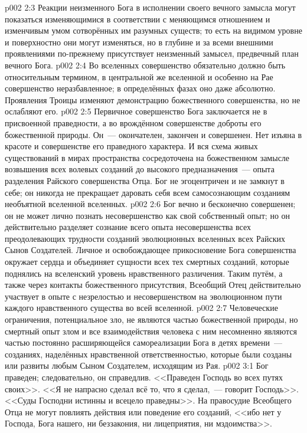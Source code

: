 \vs p002 2:3 \pc Реакции неизменного Бога в исполнении своего вечного замысла могут показаться изменяющимися в соответствии с меняющимся отношением и изменчивым умом сотворённых им разумных существ; то есть на видимом уровне и поверхностно они могут изменяться, но в глубине и за всеми внешними проявлениями по\hyp{}прежнему присутствует неизменный замысел, предвечный план вечного Бога.
\vs p002 2:4 Во вселенных совершенство обязательно должно быть относительным термином, в центральной же вселенной и особенно на Рае совершенство неразбавленное; в определённых фазах оно даже абсолютно. Проявления Троицы изменяют демонстрацию божественного совершенства, но не ослабляют его.
\vs p002 2:5 \pc Первичное совершенство Бога заключается не в присвоенной праведности, а во врождённом совершенстве доброты его божественной природы. Он~--- окончателен, закончен и совершенен. Нет изъяна в красоте и совершенстве его праведного характера. И вся схема живых существований в мирах пространства сосредоточена на божественном замысле возвышения всех волевых созданий до высокого предназначения~--- опыта разделения Райского совершенства Отца. Бог не эгоцентричен и не замкнут в себе; он никогда не прекращает даровать себя всем самосознающим созданиям необъятной вселенной вселенных.
\vs p002 2:6 Бог вечно и бесконечно совершенен; он не может лично познать несовершенство как свой собственный опыт; но он действительно разделяет сознание всего опыта несовершенства всех преодолевающих трудности созданий эволюционных вселенных всех Райских Сынов Создателей. Личное и освобождающее прикосновение Бога совершенства окружает сердца и объединяет сущности всех тех смертных созданий, которые поднялись на вселенский уровень нравственного различения. Таким путём, а также через контакты божественного присутствия, Всеобщий Отец действительно участвует в опыте  с незрелостью и несовершенством на эволюционном пути каждого нравственного существа во всей вселенной.
\vs p002 2:7 Человеческие ограничения, потенциальное зло, не являются частью божественной природы, но смертный опыт  злом и все взаимодействия человека с ним несомненно являются частью постоянно расширяющейся самореализации Бога в детях времени~--- созданиях, наделённых нравственной ответственностью, которые были созданы или развиты любым Сыном Создателем, исходящим из Рая.
\vs p002 3:1 Бог праведен; следовательно, он справедлив. <<Праведен Господь во всех путях своих>>. <<Я не напрасно сделал всё то, что я сделал,~--- говорит Господь>>. <<Суды Господни истинны и всецело праведны>>. На правосудие Всеобщего Отца не могут повлиять действия или поведение его созданий, <<ибо нет у Господа, Бога нашего, ни беззакония, ни лицеприятия, ни мздоимства>>.
